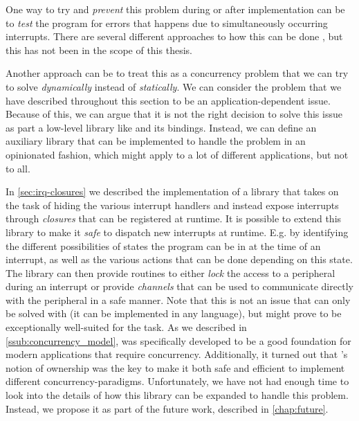 One way to try and \emph{prevent} this problem during or after implementation can be to \emph{test} the program for errors that happens due to simultaneously occurring interrupts.
There are several different approaches to how this can be done \cite{Higashi2010,Regehr2005}, but this has not been in the scope of this thesis.

Another approach can be to treat this as a concurrency problem that we can try to solve \emph{dynamically} instead of \emph{statically}.
We can consider the problem that we have described throughout this section to be an application-dependent issue.
Because of this, we can argue that it is not the right decision to solve this issue as part a low-level library like {\emlib} and its bindings.
Instead, we can define an auxiliary library that can be implemented to handle the problem in an opinionated fashion, which might apply to a lot of different applications, but not to all.

In \autoref{sec:irq-closures} we described the implementation of a library that takes on the task of hiding the various interrupt handlers and instead expose interrupts through \emph{closures} that can be registered at runtime.
It is possible to extend this library to make it \emph{safe} to dispatch new interrupts at runtime.
E.g. by identifying the different possibilities of states the program can be in at the time of an interrupt, as well as the various actions that can be done depending on this state.
The library can then provide routines to either \emph{lock} the access to a peripheral during an interrupt or provide \emph{channels} that can be used to communicate directly with the peripheral in a safe manner.
Note that this is not an issue that can only be solved with {\rust} (it can be implemented in any language), but {\rust} might prove to be exceptionally well-suited for the task.
As we described in \autoref{ssub:concurrency_model}, {\rust} was specifically developed to be a good foundation for modern applications that require concurrency.
Additionally, it turned out that {\rust}'s notion of ownership was the key to make it both safe and efficient to implement different concurrency-paradigms.
Unfortunately, we have not had enough time to look into the details of how this library can be expanded to handle this problem.
Instead, we propose it as part of the future work, described in \autoref{chap:future}.
